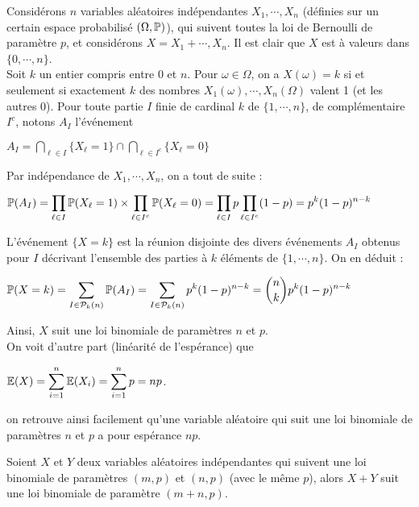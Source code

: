\documentclass[12pt,a4paper]{report}
\begin{document}
\begin{exemple}{}
Considérons $n$ variables aléatoires indépendantes $X_1,\cdots,X_n$ (définies sur un certain espace probabilisé $(\Omega, \mathbb{P})$), qui suivent toutes la loi de Bernoulli de paramètre $p$, et considérons $X = X_1+\cdots, X_n$. Il est clair que $X$ est à valeurs dans $\{0,\cdots,n\}$. \\

Soit $k$ un entier compris entre $0$ et $n$. Pour $\omega \in \Omega$, on a $X(\omega) = k$ si et seulement si exactement $k$ des nombres $X_1(\omega), \cdots, X_n(\Omega)$ valent 1 (et les autres 0). Pour toute partie $I$ finie de cardinal $k$ de $\{1,\cdots,n\}$, de complémentaire $I^c$, notons $A_I$ l'événement 
\begin{center}
$A_I = \displaystyle \bigcap_{\ell \in I} \{X_\ell = 1\} \cap \bigcap_{\ell \in I^c} \{X_\ell = 0\}$
\end{center}

Par indépendance de $X_1,\cdots,X_n$, on a tout de suite : 
\begin{center}
$\mathbb{P}(A_I) = \displaystyle \prod_{\ell \in I} \mathbb{P}(X_\ell = 1) \times \prod_{\ell \in I^c} \mathbb{P}(X_\ell = 0) = \prod_{\ell \in I} p \prod_{\ell \in I^c} (1-p) = p^k(1-p)^{n-k}$
\end{center}

L'événement $\{X=k\}$ est la réunion disjointe des divers événements $A_I$ obtenus pour $I$ décrivant l'ensemble des parties à $k$ éléments de $\{1,\cdots, n\}$. On en déduit :
\begin{center}
$\mathbb{P}(X=k) = \displaystyle \sum_{I \in \mathcal{P}_k(n)} \mathbb{P}(A_I) = \sum_{I \in \mathcal{P}_k(n)} p^k(1-p)^{n-k} = \binom{n}{k} p^k (1-p)^{n-k}$
\end{center}

Ainsi, $X$ suit une loi binomiale de paramètres $n$ et $p$. \\

On voit d'autre part (linéarité de l'espérance) que 
\begin{center}
$\mathbb{E}(X) = \displaystyle \sum_{i=1}^n \mathbb{E}(X_i) = \sum_{i=1}^n p = np$.
\end{center}

on retrouve ainsi facilement qu'une variable aléatoire qui suit une loi binomiale de paramètres $n$ et $p$ a pour espérance $np$.
\end{exemple}

\begin{proposition}{}{}
Soient $X$ et $Y$ deux variables aléatoires indépendantes qui suivent une loi binomiale de paramètres $(m,p)$ et $(n,p)$ (avec le même $p$), alors $X+Y$ suit une loi binomiale de paramètre $(m+n,p)$.
\end{proposition}
\end{document}
